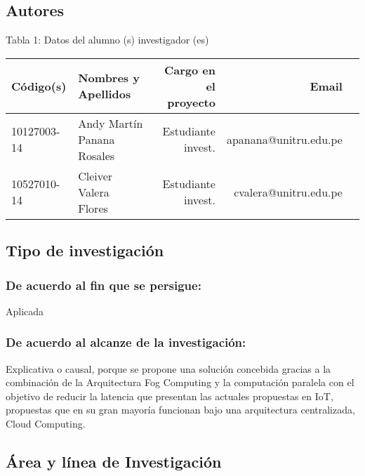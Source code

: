 \subsection{Autores}
\begin{center}
    \begin{center}
        { Tabla 1: Datos del alumno (s) investigador (es) }\par 
    \end{center}     
    \begin{table}[!ht]
        \centering
        \begin{tabular}{llrrr} \toprule
        {\bf Código(s)} & {\bf Nombres y Apellidos} & {\bf Cargo en el proyecto} & {\bf Email} \\ \midrule
        10127003-14 & Andy Martín Panana Rosales & Estudiante invest. & apanana@unitru.edu.pe           \\
        10527010-14    & Cleiver Valera Flores & Estudiante invest. & cvalera@unitru.edu.pe            \\ \bottomrule
        \end{tabular}
    \end{table}    
\end{center}

\subsection{Tipo de investigación}
    \subsubsection{De acuerdo al fin que se persigue:} 
    Aplicada
                    
    \subsubsection{De acuerdo al alcanze de la investigación:} 
    Explicativa o causal, porque se propone una solución concebida gracias a la combinación de la Arquitectura Fog Computing y la computación paralela con el objetivo de reducir la latencia que presentan las actuales propuestas en IoT, propuestas que en su gran mayoría funcionan bajo una arquitectura centralizada, Cloud Computing.

\subsection{Área y línea de Investigación}
